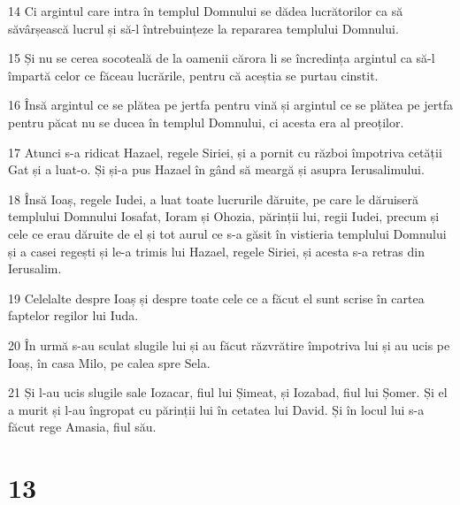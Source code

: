 \par 14 Ci argintul care intra în templul Domnului se dădea lucrătorilor ca să săvârșească lucrul și să-l întrebuințeze la repararea templului Domnului.
\par 15 Și nu se cerea socoteală de la oamenii cărora li se încredința argintul ca să-l împartă celor ce făceau lucrările, pentru că aceștia se purtau cinstit.
\par 16 Însă argintul ce se plătea pe jertfa pentru vină și argintul ce se plătea pe jertfa pentru păcat nu se ducea în templul Domnului, ci acesta era al preoților.
\par 17 Atunci s-a ridicat Hazael, regele Siriei, și a pornit cu război împotriva cetății Gat și a luat-o. Și și-a pus Hazael în gând să meargă și asupra Ierusalimului.
\par 18 Însă Ioaș, regele Iudei, a luat toate lucrurile dăruite, pe care le dăruiseră templului Domnului Iosafat, Ioram și Ohozia, părinții lui, regii Iudei, precum și cele ce erau dăruite de el și tot aurul ce s-a găsit în vistieria templului Domnului și a casei regești și le-a trimis lui Hazael, regele Siriei, și acesta s-a retras din Ierusalim.
\par 19 Celelalte despre Ioaș și despre toate cele ce a făcut el sunt scrise în cartea faptelor regilor lui Iuda.
\par 20 În urmă s-au sculat slugile lui și au făcut răzvrătire împotriva lui și au ucis pe Ioaș, în casa Milo, pe calea spre Sela.
\par 21 Și l-au ucis slugile sale Iozacar, fiul lui Șimeat, și Iozabad, fiul lui Șomer. Și el a murit și l-au îngropat cu părinții lui în cetatea lui David. Și în locul lui s-a făcut rege Amasia, fiul său.

\chapter{13}

